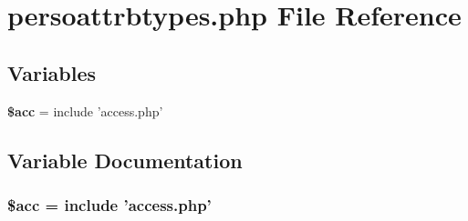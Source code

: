 \section{persoattrbtypes.php File Reference}
\label{persoattrbtypes_8php}


\subsection*{Variables}
\begin{CompactItemize}
\item 
{\bf \$acc} = include 'access.php'
\end{CompactItemize}


\subsection{Variable Documentation}
\subsubsection{\setlength{\rightskip}{0pt plus 5cm}\$acc = include 'access.php'}\label{persoattrbtypes_8php_542926c588a05eb69553d79c83cf73da}


